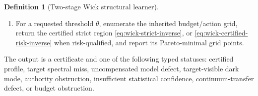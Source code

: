 \documentclass[11pt]{article}
\numberwithin{section}{part}
\theoremstyle{plain}
\theoremstyle{definition}
\newtheorem{definition}[definition]{Definition}
\theoremstyle{remark}
\begin{document}
\begin{definition}[Two-stage Wick structural learner]
\begin{enumerate}[label=\textup{(L\arabic*)}]
\(\varepsilon\)-maximizer of the saturated profile.  Ties within the
certified tolerance use the inherited Part~I Pareto order on the complete
resource--action vector; the declared candidate order only enumerates
unresolved equals.  When population-risk accuracy \(\epsilon\)
and visibility threshold \(\theta\) are requested, construct
\(U_W\) from the inherited Rademacher union/cover or PAC--Bayes
mixture/coefficient certificate in
\cref{def:wick-inherited-family-selection-certificate}, and apply
\eqref{eq:wick-certified-complexity-selector} to the certified
risk-qualified saturated profile; on the RL branch use
\eqref{eq:wick-rl-working-certificate}.  An empty certified feasible set is
reported by its typed failure status.
\item For a requested threshold \(\theta\), enumerate the inherited
budget/action grid, return the certified strict region
\eqref{eq:wick-strict-inverse}, or
\eqref{eq:wick-certified-risk-inverse} when risk-qualified, and report its
Pareto-minimal grid points.
\end{enumerate}
The output is a certificate and one of the following typed statuses:
certified profile, target spectral miss, uncompensated model defect,
target-visible dark mode, authority obstruction, insufficient statistical
confidence, continuum-transfer defect, or budget obstruction.
\end{definition}
\end{document}
